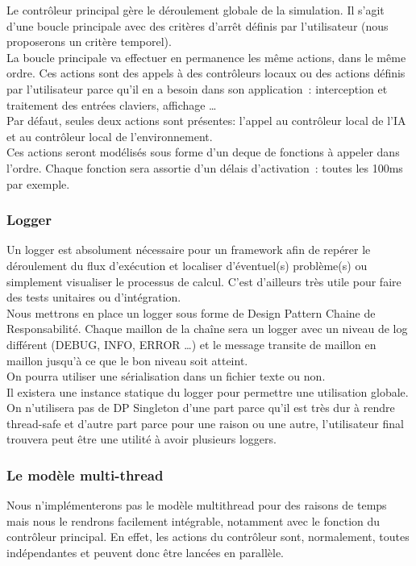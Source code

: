 Le contrôleur principal gère le déroulement globale de la simulation. Il s'agit d'une boucle principale avec des critères d'arrêt définis par l'utilisateur (nous proposerons un critère temporel).\\
\indent La boucle principale va effectuer en permanence les même actions, dans le même ordre. Ces actions sont des appels à des contrôleurs locaux ou des actions définis par l'utilisateur parce qu'il en a besoin dans son application~: interception et traitement des entrées claviers, affichage \ldots \\
\indent Par défaut, seules deux actions sont présentes: l'appel au contrôleur local de l'IA et au contrôleur local de l'environnement.\\

Ces actions seront modélisés sous forme d'un deque de fonctions à appeler dans l'ordre. Chaque fonction sera assortie d'un délais d'activation~: toutes les 100ms par exemple.

\subsubsection*{Logger}
Un logger est absolument nécessaire pour un framework afin de repérer le déroulement du flux d'exécution et localiser d'éventuel(s) problème(s) ou simplement visualiser le processus de calcul. C'est d'ailleurs très utile pour faire des tests unitaires ou d'intégration.\\
\indent Nous mettrons en place un logger sous forme de Design Pattern Chaine de Responsabilité. Chaque maillon de la chaîne sera un logger avec un niveau de log différent (DEBUG, INFO, ERROR \ldots ) et le message transite de maillon en maillon jusqu'à ce que le bon niveau soit atteint.\\
\indent On pourra utiliser une sérialisation dans un fichier texte ou non.\\

Il existera une instance statique du logger pour permettre une utilisation globale. On n'utilisera pas de DP Singleton d'une part parce qu'il est très dur à rendre thread-safe et d'autre part parce pour une raison ou une autre, l'utilisateur final trouvera peut être une utilité à avoir plusieurs loggers.

\subsubsection*{Le modèle multi-thread}
Nous n'implémenterons pas le modèle multithread pour des raisons de temps mais nous le rendrons facilement intégrable, notamment avec le fonction du contrôleur principal. En effet, les actions du contrôleur sont, normalement, toutes indépendantes et peuvent donc être lancées en parallèle.\\

